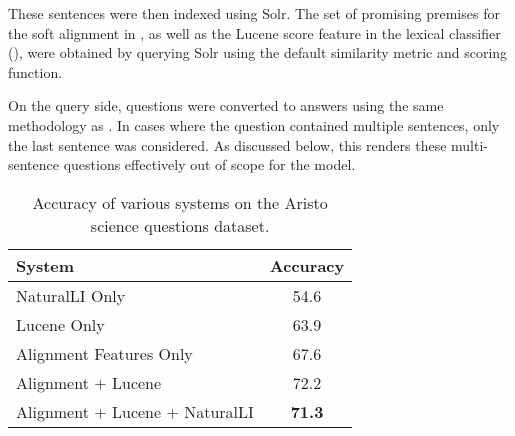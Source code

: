 These sentences were then indexed using Solr.
The set of promising premises for the soft alignment in , as well as
  the Lucene score feature in the lexical classifier (),
  were obtained by querying Solr using the default similarity metric and scoring function.

On the query side, questions were converted to answers using the same methodology as
  .
In cases where the question contained multiple sentences, only the last sentence
  was considered.
As discussed below, this renders these multi-sentence questions effectively out of
  scope for the model.



%
%
\def\t#1{\small{#1}}
\def\b#1{\t{\textbf{#1}}}
\def\colspaceS{2.0mm}
\def\colspaceM{3.0mm}
\def\colspaceL{4.0mm}

\begin{table}
\begin{center}
\begin{tabular}{l@{\hskip \colspaceL}c}
\hline
\textbf{System} & \textbf{Accuracy} \\
\hline
\t{NaturalLI Only}                 & \t{54.6} \\
\t{Lucene Only}                    & \t{63.9} \\
\t{Alignment Features Only}        & \t{67.6} \\
\t{Alignment + Lucene}             & \t{72.2} \\
\t{Alignment + Lucene + NaturalLI} & \b{71.3} \\
\hline
\end{tabular}
\end{center}
\caption{
\label{tab:aristonaturalli}
Accuracy of various systems on the Aristo science questions dataset.
}
\end{table}
%
%

